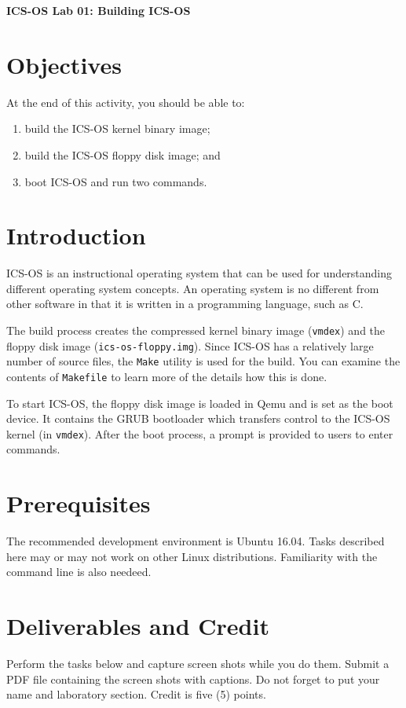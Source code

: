 \documentclass[a4paper, 11pt,oneside]{article}
\begin{document}
\begin{center}
	{\LARGE \textbf{ICS-OS Lab 01: Building ICS-OS}}
\end{center}

\section*{Objectives}
   At the end of this activity, you should be able to:
   \begin{enumerate}[itemsep=0pt,parsep=0pt]
       \item build the ICS-OS kernel binary image;
       \item build the ICS-OS floppy disk image; and
       \item boot ICS-OS and run two commands.
   \end{enumerate}   

\section{Introduction}
ICS-OS is an instructional operating system that can be used for understanding different operating system concepts.  An operating system is no different from other software in that it is written in a programming language, such as C. 

The build process creates the compressed kernel binary image (\texttt{vmdex}) and the floppy disk image (\texttt{ics-os-floppy.img}). Since ICS-OS has a relatively large number of source files, 
the \texttt{Make} utility is used for the build. You can examine the contents of \texttt{Makefile} 
to learn more of the details how this is done.

To start ICS-OS, the floppy disk image is loaded in Qemu and is set as the boot device. It contains 
the GRUB bootloader which transfers control to the ICS-OS kernel (in \texttt{vmdex}). After the boot process, a prompt is provided to users to enter commands. 

\section{Prerequisites}
The recommended development environment is Ubuntu 16.04. Tasks described here may or may not 
work on other Linux distributions. Familiarity with the command line is also needeed.

\section{Deliverables and Credit}
Perform the tasks below and capture screen shots while you do them. Submit a PDF file 
containing the screen shots with captions. Do not forget to put your name and laboratory section.
Credit is five (5) points.
\end{document}
